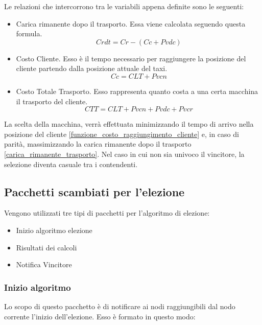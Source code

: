 Le relazioni che intercorrono tra le variabili appena definite sono le seguenti: 
\begin{itemize}
	\item  Carica rimanente dopo il trasporto. Essa viene calcolata seguendo questa formula.
		\begin{equation} \label{carica_rimanente_trasporto}
			Crdt = Cr - (Cc + Pvdc)
		\end{equation}
	\item Costo Cliente. Esso è il tempo necessario per raggiungere la posizione del cliente partendo dalla posizione attuale del taxi.
		\begin{equation} \label{funzione_costo_raggiungimento_cliente}
			Cc = CLT + Pvcn
		\end{equation}
	\item  Costo Totale Trasporto. Esso rappresenta quanto costa a una certa macchina il trasporto del cliente.
		\begin{equation} \label{funzione_costo_totale_macchina}
			CTT = CLT + Pvcn + Pvdc + Pvcr
		\end{equation}
\end{itemize}

La scelta della macchina, verrà effettuata minimizzando il tempo di arrivo nella posizione del cliente \ref{funzione_costo_raggiungimento_cliente} e, in caso di parità, massimizzando la carica rimanente dopo il trasporto \ref{carica_rimanente_trasporto}. Nel caso in cui non sia univoco il vincitore, la selezione diventa casuale tra i contendenti.

\subsection{Pacchetti scambiati per l'elezione}\label{descrizione_pacchetto}
Vengono utilizzati tre tipi di pacchetti per l'algoritmo di elezione:
\begin{itemize}
	\item Inizio algoritmo elezione
	\item Risultati dei calcoli
	\item Notifica Vincitore
\end{itemize}

\subsubsection{Inizio algoritmo}
Lo scopo di questo pacchetto è di notificare ai nodi raggiungibili dal nodo corrente l'inizio dell'elezione. Esso è formato in questo modo:

